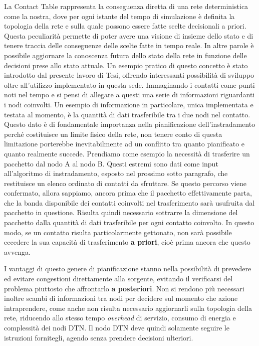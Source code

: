 \documentclass[12pt,a4paper,oneside]{book}
\begin{document}
		La Contact Table rappresenta la conseguenza diretta di una rete deterministica come la nostra, dove per ogni istante del tempo di simulazione è definita la topologia della rete e sulla quale possono essere fatte scelte decisionali a priori. Questa peculiarità permette di poter avere una visione di insieme dello stato e di tenere traccia delle conseguenze delle scelte fatte in tempo reale. In altre parole è possibile aggiornare la conoscenza futura dello stato della rete in funzione delle decisioni prese allo stato attuale. Un esempio pratico di questo concetto è stato introdotto dal presente lavoro di Tesi, offrendo interessanti possibilità di sviluppo oltre all'utilizzo implementato in questa sede. 
		Immaginando i contatti come punti noti nel tempo e si pensi di allegare a questi una serie di informazioni riguardanti i nodi coinvolti. Un esempio di informazione in particolare, unica implementata e testata al momento, è la quantità di dati trasferibile tra i due nodi nel contatto. Questo dato è di fondamentale importanza nella pianificazione dell'instradamento perché costituisce un limite fisico della rete, non tenere conto di questa limitazione porterebbe inevitabilmente ad un conflitto tra quanto pianificato e quanto realmente succede. 
		Prendiamo come esempio la necessità di trasferire un pacchetto dal nodo A al nodo B. Questi estremi sono dati come input all'algoritmo di instradamento, esposto nel prossimo sotto paragrafo, che restituisce un elenco ordinato di contatti da sfruttare. Se questo percorso viene confermato, allora sappiamo, ancora prima che il pacchetto effettivamente parta, che la banda disponibile dei contatti coinvolti nel trasferimento sarà usufruita dal pacchetto in questione. Risulta quindi necessario sottrarre la dimensione del pacchetto dalla quantità di dati trasferibile per ogni contatto coinvolto. In questo modo, se un contatto risulta particolarmente gettonato, non sarà possibile eccedere la sua capacità di trasferimento {\bf a priori}, cioè prima ancora che questo avvenga. 
		
		I vantaggi di questo genere di pianificazione stanno nella possibilità di prevedere ed evitare congestioni direttamente alla sorgente, evitando il verificarsi del problema piuttosto che affrontarlo {\bf a posteriori}. Non si rendono più necessari inoltre scambi di informazioni tra nodi per decidere sul momento che azione intraprendere, come anche non risulta necessario aggiornarli sulla topologia della rete, riducendo allo stesso tempo {\it overhead} di servizio, consumo di energia e complessità dei nodi DTN. Il nodo DTN deve quindi solamente seguire le istruzioni fornitegli, agendo senza prendere decisioni ulteriori.
		
\end{document}
